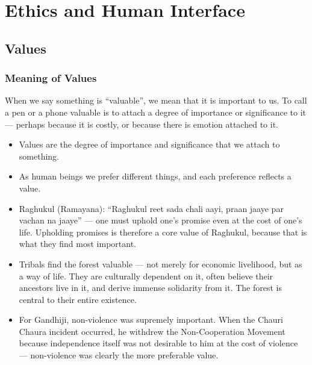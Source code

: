 
\chapter{Ethics and Human Interface}
\vspace{14pt}

\section{Values}

\subsection{Meaning of Values}

When we say something is ``valuable'', we mean that it is important to us. To call a pen or a phone valuable is to attach a degree of importance or significance to it --- perhaps because it is costly, or because there is emotion attached to it.

\begin{KeyConcept}
\begin{itemize}
\item Values are the degree of importance and significance that we attach to something.
\item As human beings we prefer different things, and each preference reflects a value.
\end{itemize}
\end{KeyConcept}

\begin{ExampleBox}
\begin{itemize}
\item Raghukul (Ramayana): ``Raghukul reet sada chali aayi, praan jaaye par vachan na jaaye'' --- one must uphold one's promise even at the cost of one's life. Upholding promises is therefore a core value of Raghukul, because that is what they find most important.
\item Tribals find the forest valuable --- not merely for economic livelihood, but as a way of life. They are culturally dependent on it, often believe their ancestors live in it, and derive immense solidarity from it. The forest is central to their entire existence.
\item For Gandhiji, non-violence was supremely important. When the Chauri Chaura incident occurred, he withdrew the Non-Cooperation Movement because independence itself was not desirable to him at the cost of violence --- non-violence was clearly the more preferable value.
\end{itemize}
\end{ExampleBox}

